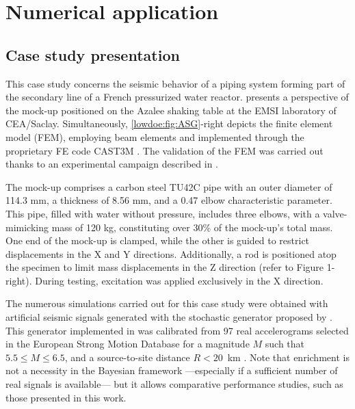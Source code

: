 



\section{Numerical application}\label{lowdoe:sec:application}

\subsection{Case study presentation}\label{lowdoe:sec:casestudy}

This case study concerns the seismic behavior of a piping system forming part of the secondary line of a French pressurized water reactor.  presents a perspective of the mock-up positioned on the Azalee shaking table at the EMSI laboratory of CEA/Saclay. Simultaneously, \cref{lowdoe:fig:ASG}-right depicts the finite element model (FEM), employing beam elements and implemented through the proprietary FE code CAST3M \citep{cea_cast3m_2019}. The validation of the FEM was carried out thanks to an experimental campaign described in \cite{touboul_seismic_1999}.

The mock-up comprises a carbon steel TU42C pipe with an outer diameter of 114.3 mm, a thickness of 8.56 mm, and a 0.47 elbow characteristic parameter. This pipe, filled with water without pressure, includes three elbows, with a valve-mimicking mass of 120 kg, constituting over 30\% of the mock-up's total mass. One end of the mock-up is clamped, while the other is guided to restrict displacements in the X and Y directions. Additionally, a rod is positioned atop the specimen to limit mass displacements in the Z direction (refer to Figure 1-right). During testing, excitation was applied exclusively in the X direction.

The numerous simulations carried out for this case study were obtained with artificial seismic signals generated with the stochastic generator proposed by \citet{rezaeian_stochastic_2010}. This generator implemented in \cite{sainct_efficient_2020} was calibrated from 97 real accelerograms selected in the European Strong Motion Database for a magnitude $M$ such that $5.5 \leq M \leq 6.5$, and a source-to-site distance $R < 20$~km \citep{ambraseys_dissemination_2000}. Note that enrichment is not a necessity in the Bayesian framework ---especially if a sufficient number of real signals is available--- but it allows comparative performance studies, such as those presented in this work.

